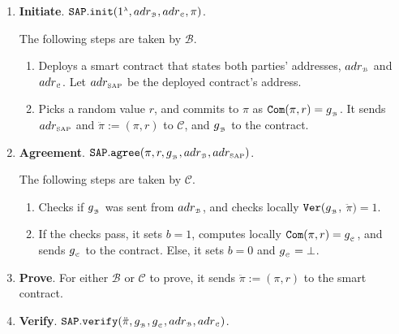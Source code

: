  \begin{enumerate}[leftmargin=5.2mm]
 \item\textbf{Initiate}. $\mathtt{SAP.init}(1^{\scriptscriptstyle\lambda}, adr_{\scriptscriptstyle\mathcal{\scriptscriptstyle B}}, adr_{\scriptscriptstyle\mathcal{C}}, \pi )$.

 The following steps are taken by  $\mathcal B$.
  \begin{enumerate}
  \item\label{SAP::deploy-contract}  Deploys a smart contract that   states both parties'  addresses, $adr_{\scriptscriptstyle\mathcal{B}}$ and  $adr_{\scriptscriptstyle\mathcal{C}}$. Let $adr_{\scriptscriptstyle\text{SAP}}$ be the deployed contract's address. 
%
   \item  Picks a random value $r$, and commits to $\pi$ as $\mathtt{Com}(\pi, r)=g_{_{\scriptscriptstyle \mathcal{B}}}$.
    It sends $adr_{\scriptscriptstyle\text{SAP}}$ and $\ddot{\pi}:=(\pi, r)$  to  $\mathcal C$, and $g_{_{\scriptscriptstyle\mathcal B}}$ to the contract. 
    \end{enumerate}
    \item\textbf{Agreement}. $\mathtt{SAP.agree}(\pi, r, g_{_{\scriptscriptstyle \mathcal{B}}}, adr_{\scriptscriptstyle\mathcal{B}}, adr_{\scriptscriptstyle\text{SAP}})$.

     The following steps are taken by  $\mathcal C$.
     \begin{enumerate}
   \item Checks  if $g_{_{\scriptscriptstyle \mathcal{B}}}$ was  sent  from $adr_{\scriptscriptstyle \mathcal{B}}$, and checks locally $\mathtt{Ver}(g_{_{\scriptscriptstyle\mathcal B}}, $ $\ddot{\pi})=1$.
   \item If the checks pass, it sets $b=1$,    computes locally $\mathtt{Com}(\pi, r)=g_{_{\scriptscriptstyle\mathcal C}}$, and sends $g_{_{\scriptscriptstyle\mathcal C}}$ to the contract. Else, it sets $b=0$ and $g_{_{\scriptscriptstyle\mathcal C}}=\bot$.
    \end{enumerate}
%
   \item\textbf{Prove}. For either $\mathcal B$ or $\mathcal C$ to prove, it sends $\ddot{\pi}:=(\pi, r)$  to the smart contract. 
 \item\textbf{Verify}. $\mathtt{SAP.verify}(\ddot{\pi}, g_{_{\scriptscriptstyle\mathcal B}},g_{_{\scriptscriptstyle\mathcal C}}, adr_{\scriptscriptstyle\mathcal{B}}, adr_{\scriptscriptstyle\mathcal{C}})$. 
 

\end{enumerate}
